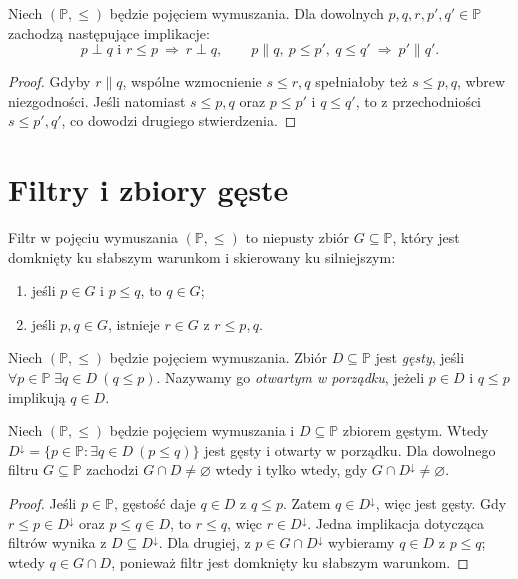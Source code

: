 \begin{lemat}
\label{lem:forcing-compatibility}
Niech $(\mathbb P,\leq)$ będzie pojęciem wymuszania.
Dla dowolnych $p,q,r,p',q'\in\mathbb P$ zachodzą
następujące implikacje:
\[
 p\perp q\text{ i }r\leq p\ \Longrightarrow\ r\perp q,
 \qquad
 p\parallel q,\ p\leq p',\ q\leq q'
 \ \Longrightarrow\ p'\parallel q'.
\]
\end{lemat}
\begin{proof}
Gdyby $r\parallel q$, wspólne wzmocnienie
$s\leq r,q$ spełniałoby też $s\leq p,q$,
wbrew niezgodności. Jeśli natomiast $s\leq p,q$
oraz $p\leq p'$ i $q\leq q'$, to z przechodniości
$s\leq p',q'$, co dowodzi drugiego stwierdzenia.
\end{proof}

\section{Filtry i zbiory gęste}
\begin{definicja}[Filtr]\label{def:forcing-filter}
Filtr w pojęciu wymuszania $(\mathbb P,\leq)$ to niepusty
zbiór $G\subseteq\mathbb P$, który jest domknięty
ku słabszym warunkom i skierowany ku silniejszym:
\begin{enumerate}
\item jeśli $p\in G$ i $p\leq q$, to $q\in G$;
\item jeśli $p,q\in G$, istnieje $r\in G$ z $r\leq p,q$.
\end{enumerate}
\end{definicja}

\begin{definicja}[Gęstość]\label{def:forcing-dense}
Niech $(\mathbb P,\leq)$ będzie pojęciem wymuszania.
Zbiór $D\subseteq\mathbb P$ jest \emph{gęsty},
jeśli $\forall p\in\mathbb P\;\exists q\in D\ (q\leq p)$.
Nazywamy go \emph{otwartym w porządku},
jeżeli $p\in D$ i $q\leq p$ implikują $q\in D$.
\end{definicja}

\begin{lemat}
\label{lem:forcing-open-dense}
Niech $(\mathbb P,\leq)$ będzie pojęciem
wymuszania i $D\subseteq\mathbb P$ zbiorem gęstym.
Wtedy
$D^\downarrow=\{p\in\mathbb P:
\exists q\in D\ (p\leq q)\}$
jest gęsty i otwarty w porządku.
Dla dowolnego filtru $G\subseteq\mathbb P$ zachodzi
$G\cap D\ne\varnothing$ wtedy i tylko wtedy,
gdy $G\cap D^\downarrow\ne\varnothing$.
\end{lemat}
\begin{proof}
Jeśli $p\in\mathbb P$, gęstość daje
$q\in D$ z $q\leq p$. Zatem $q\in D^\downarrow$,
więc jest gęsty. Gdy $r\leq p\in D^\downarrow$
oraz $p\leq q\in D$, to $r\leq q$, więc
$r\in D^\downarrow$. Jedna implikacja dotycząca
filtrów wynika z $D\subseteq D^\downarrow$.
Dla drugiej, z $p\in G\cap D^\downarrow$
wybieramy $q\in D$ z $p\leq q$; wtedy
$q\in G\cap D$, ponieważ filtr jest
domknięty ku słabszym warunkom.
\end{proof}

